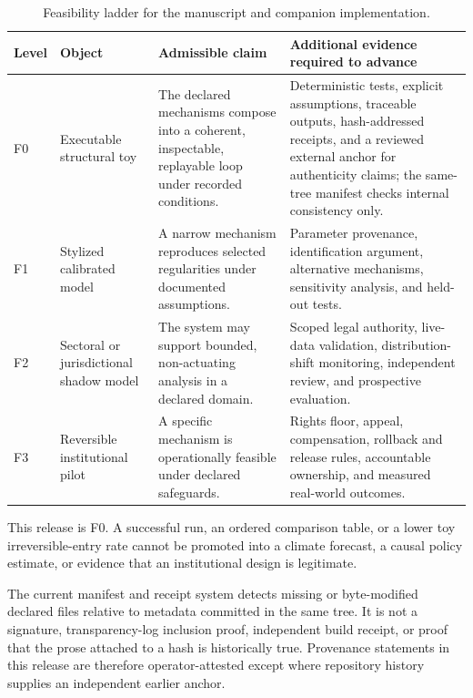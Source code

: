 \documentclass[11pt,a4paper]{article}
\numberwithin{equation}{section}
\theoremstyle{definition}
\theoremstyle{plain}
\theoremstyle{remark}
\begin{document}
\begin{table}[H]
\centering
\small
\caption{Feasibility ladder for the manuscript and companion implementation.}
\label{tab:feasibility}
\begin{tabularx}{\textwidth}{@{}L{0.08\textwidth}L{0.24\textwidth}Y Y@{}}
\toprule
\textbf{Level} & \textbf{Object} & \textbf{Admissible claim} & \textbf{Additional evidence required to advance} \\
\midrule
F0 & Executable structural toy & The declared mechanisms compose into a coherent, inspectable, replayable loop under recorded conditions. & Deterministic tests, explicit assumptions, traceable outputs, hash-addressed receipts, and a reviewed external anchor for authenticity claims; the same-tree manifest checks internal consistency only. \\
\addlinespace
F1 & Stylized calibrated model & A narrow mechanism reproduces selected regularities under documented assumptions. & Parameter provenance, identification argument, alternative mechanisms, sensitivity analysis, and held-out tests. \\
\addlinespace
F2 & Sectoral or jurisdictional shadow model & The system may support bounded, non-actuating analysis in a declared domain. & Scoped legal authority, live-data validation, distribution-shift monitoring, independent review, and prospective evaluation. \\
\addlinespace
F3 & Reversible institutional pilot & A specific mechanism is operationally feasible under declared safeguards. & Rights floor, appeal, compensation, rollback and release rules, accountable ownership, and measured real-world outcomes. \\
\bottomrule
\end{tabularx}
\end{table}

This release is F0. A successful run, an ordered comparison table, or a lower toy irreversible-entry rate cannot be promoted into a climate forecast, a causal policy estimate, or evidence that an institutional design is legitimate.

The current manifest and receipt system detects missing or byte-modified declared files relative to metadata committed in the same tree. It is not a signature, transparency-log inclusion proof, independent build receipt, or proof that the prose attached to a hash is historically true. Provenance statements in this release are therefore operator-attested except where repository history supplies an independent earlier anchor.
\end{document}
